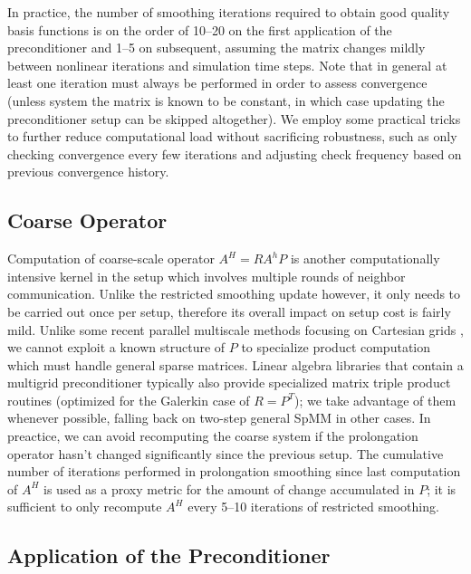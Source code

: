 In practice, the number of smoothing iterations required to obtain good quality basis functions is on the order of 10--20 on the first application of the preconditioner and 1--5 on subsequent, assuming the matrix changes mildly between nonlinear iterations and simulation time steps.   Note that in general at least one iteration must always be performed in order to assess convergence (unless system the matrix is known to be constant, in which case updating the preconditioner setup can be skipped altogether).   We employ some practical tricks to further reduce computational load without sacrificing robustness, such as only checking convergence every few iterations and adjusting check frequency based on previous convergence history.

\subsection{Coarse Operator}
\label{subsec:par_kernels_coarse}

Computation of coarse-scale operator $A^H = RA^hP$ is another computationally intensive kernel in the setup which involves multiple rounds of neighbor communication.   Unlike the restricted smoothing update however, it only needs to be carried out once per setup, therefore its overall impact on setup cost is fairly mild.   Unlike some recent parallel multiscale methods focusing on Cartesian grids \cite{Manea2016,Manea2019,Manea2021}, we cannot exploit a known structure of $P$ to specialize product computation which must handle general sparse matrices.   Linear algebra libraries that contain a multigrid preconditioner typically also provide specialized matrix triple product routines (optimized for the Galerkin case of $R = P^T$); we take advantage of them whenever possible, falling back on two-step general SpMM in other cases.   In preactice, we can avoid recomputing the coarse system if the prolongation operator hasn't changed significantly since the previous setup.   The cumulative number of iterations performed in prolongation smoothing since last computation of $A^H$ is used as a proxy metric for the amount of change accumulated in $P$; it is sufficient to only recompute $A^H$ every 5--10 iterations of restricted smoothing.

\subsection{Application of the Preconditioner}
\label{subsec:par_kernels_apply}

